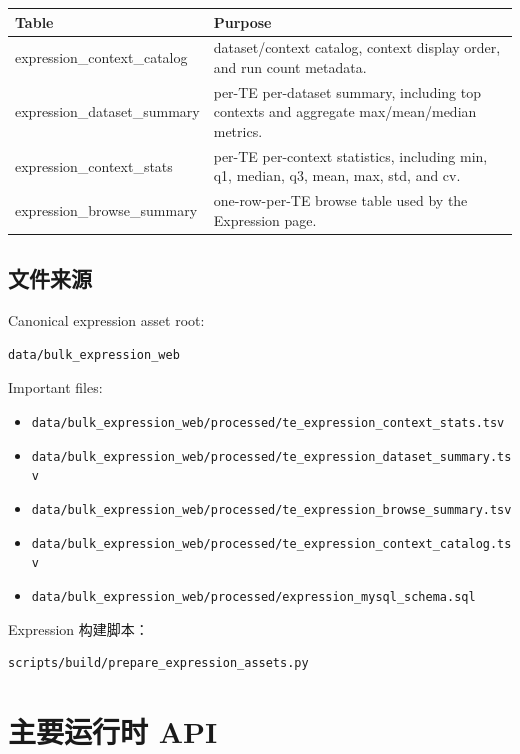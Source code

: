 \documentclass[UTF8]{ctexart}
\begin{document}
\begin{longtable}{L{5.4cm}L{9.2cm}}
\toprule
Table & Purpose \\
\midrule
\endhead
expression\_context\_catalog & dataset/context catalog, context display order, and run count metadata. \\
expression\_dataset\_summary & per-TE per-dataset summary, including top contexts and aggregate max/mean/median metrics. \\
expression\_context\_stats & per-TE per-context statistics, including min, q1, median, q3, mean, max, std, and cv. \\
expression\_browse\_summary & one-row-per-TE browse table used by the Expression page. \\
\bottomrule
\end{longtable}

\subsection{文件来源}

Canonical expression asset root:

\begin{verbatim}
data/bulk_expression_web
\end{verbatim}

Important files:

\begin{itemize}
  \item \verb|data/bulk_expression_web/processed/te_expression_context_stats.tsv|
  \item \verb|data/bulk_expression_web/processed/te_expression_dataset_summary.tsv|
  \item \verb|data/bulk_expression_web/processed/te_expression_browse_summary.tsv|
  \item \verb|data/bulk_expression_web/processed/te_expression_context_catalog.tsv|
  \item \verb|data/bulk_expression_web/processed/expression_mysql_schema.sql|
\end{itemize}

Expression 构建脚本：

\begin{verbatim}
scripts/build/prepare_expression_assets.py
\end{verbatim}

\section{主要运行时 API}
\end{document}
